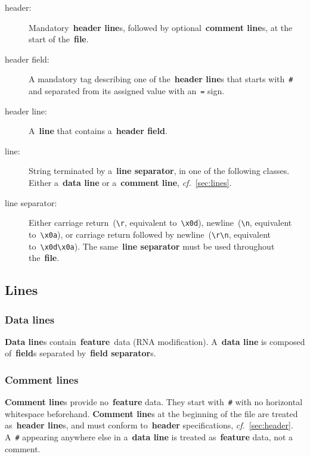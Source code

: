 \documentclass[11pt]{article}
\begin{document}
\begin{description}
\item[header:]
  Mandatory~\textbf{header line}s, followed by optional~\textbf{comment line}s, at the start of the~\textbf{file}.

\item[header field:]
  A mandatory tag describing one of the~\textbf{header line}s that starts with~\texttt{\#} and separated from its assigned value with an~\texttt{=} sign. 
  
\item[header line:]
  A~\textbf{line} that contains a~\textbf{header field}.
  
\item[line:]
  String terminated by a~\textbf{line separator}, in one of the following classes.
  Either a~\textbf{data line} or a~\textbf{comment line}, \textit{cf.}~\autoref{sec:lines}.

\item[line separator:]
  Either carriage return~(\texttt{{\textbackslash}r}, equivalent to~\texttt{{\textbackslash}x0d}), newline~(\texttt{{\textbackslash}n}, equivalent to~\texttt{{\textbackslash}x0a}), or carriage return followed by newline~(\texttt{{\textbackslash}r{\textbackslash}n}, equivalent to~\texttt{{\textbackslash}x0d{\textbackslash}x0a}).
  The same~\textbf{line separator} must be used throughout the~\textbf{file}.
\end{description}

\subsection{Lines}\label{sec:lines}

\subsubsection{Data lines}

\textbf{Data line}s contain~\textbf{feature}~data (RNA modification).
A~\textbf{data line} is composed of~\textbf{field}s separated by~\textbf{field separator}s.

\subsubsection{Comment lines}

\textbf{Comment line}s provide no~\textbf{feature} data. They start with~\texttt{\#} with no horizontal whitespace beforehand.
\textbf{Comment line}s at the beginning of the file are treated as~\textbf{header line}s, and must conform to~\textbf{header} specifications, \textit{cf.}~\autoref{sec:header}. A~\texttt{\#} appearing anywhere else in a~\textbf{data line} is treated as~\textbf{feature} data, not a comment.
\end{document}
